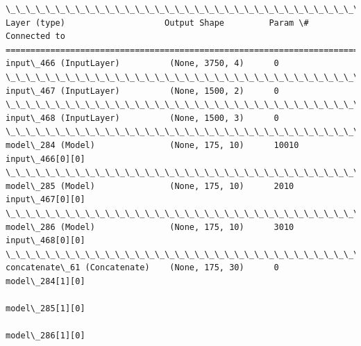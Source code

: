 \documentclass[11pt]{article}
\begin{document}
    \begin{Verbatim}[commandchars=\\\{\}]
\_\_\_\_\_\_\_\_\_\_\_\_\_\_\_\_\_\_\_\_\_\_\_\_\_\_\_\_\_\_\_\_\_\_\_\_\_\_\_\_\_\_\_\_\_\_\_\_\_\_\_\_\_\_\_\_\_\_\_\_\_\_\_\_\_\_\_\_\_\_\_\_\_\_\_\_\_\_\_\_\_\_\_\_\_\_\_\_\_\_\_\_\_\_\_\_\_\_
Layer (type)                    Output Shape         Param \#     Connected to                     
==================================================================================================
input\_466 (InputLayer)          (None, 3750, 4)      0                                            
\_\_\_\_\_\_\_\_\_\_\_\_\_\_\_\_\_\_\_\_\_\_\_\_\_\_\_\_\_\_\_\_\_\_\_\_\_\_\_\_\_\_\_\_\_\_\_\_\_\_\_\_\_\_\_\_\_\_\_\_\_\_\_\_\_\_\_\_\_\_\_\_\_\_\_\_\_\_\_\_\_\_\_\_\_\_\_\_\_\_\_\_\_\_\_\_\_\_
input\_467 (InputLayer)          (None, 1500, 2)      0                                            
\_\_\_\_\_\_\_\_\_\_\_\_\_\_\_\_\_\_\_\_\_\_\_\_\_\_\_\_\_\_\_\_\_\_\_\_\_\_\_\_\_\_\_\_\_\_\_\_\_\_\_\_\_\_\_\_\_\_\_\_\_\_\_\_\_\_\_\_\_\_\_\_\_\_\_\_\_\_\_\_\_\_\_\_\_\_\_\_\_\_\_\_\_\_\_\_\_\_
input\_468 (InputLayer)          (None, 1500, 3)      0                                            
\_\_\_\_\_\_\_\_\_\_\_\_\_\_\_\_\_\_\_\_\_\_\_\_\_\_\_\_\_\_\_\_\_\_\_\_\_\_\_\_\_\_\_\_\_\_\_\_\_\_\_\_\_\_\_\_\_\_\_\_\_\_\_\_\_\_\_\_\_\_\_\_\_\_\_\_\_\_\_\_\_\_\_\_\_\_\_\_\_\_\_\_\_\_\_\_\_\_
model\_284 (Model)               (None, 175, 10)      10010       input\_466[0][0]                  
\_\_\_\_\_\_\_\_\_\_\_\_\_\_\_\_\_\_\_\_\_\_\_\_\_\_\_\_\_\_\_\_\_\_\_\_\_\_\_\_\_\_\_\_\_\_\_\_\_\_\_\_\_\_\_\_\_\_\_\_\_\_\_\_\_\_\_\_\_\_\_\_\_\_\_\_\_\_\_\_\_\_\_\_\_\_\_\_\_\_\_\_\_\_\_\_\_\_
model\_285 (Model)               (None, 175, 10)      2010        input\_467[0][0]                  
\_\_\_\_\_\_\_\_\_\_\_\_\_\_\_\_\_\_\_\_\_\_\_\_\_\_\_\_\_\_\_\_\_\_\_\_\_\_\_\_\_\_\_\_\_\_\_\_\_\_\_\_\_\_\_\_\_\_\_\_\_\_\_\_\_\_\_\_\_\_\_\_\_\_\_\_\_\_\_\_\_\_\_\_\_\_\_\_\_\_\_\_\_\_\_\_\_\_
model\_286 (Model)               (None, 175, 10)      3010        input\_468[0][0]                  
\_\_\_\_\_\_\_\_\_\_\_\_\_\_\_\_\_\_\_\_\_\_\_\_\_\_\_\_\_\_\_\_\_\_\_\_\_\_\_\_\_\_\_\_\_\_\_\_\_\_\_\_\_\_\_\_\_\_\_\_\_\_\_\_\_\_\_\_\_\_\_\_\_\_\_\_\_\_\_\_\_\_\_\_\_\_\_\_\_\_\_\_\_\_\_\_\_\_
concatenate\_61 (Concatenate)    (None, 175, 30)      0           model\_284[1][0]                  
                                                                 model\_285[1][0]                  
                                                                 model\_286[1][0]                  

\end{Verbatim}
\end{document}

